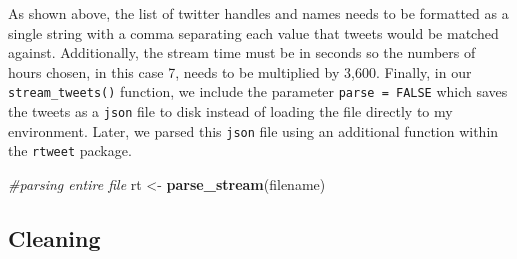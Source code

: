 \documentclass[12pt,twoside]{reedthesis}
\newenvironment{Shaded}{\begin{snugshade}}{\end{snugshade}}
\newcommand{\KeywordTok}[1]{\textcolor[rgb]{0.13,0.29,0.53}{\textbf{#1}}}
\newcommand{\StringTok}[1]{\textcolor[rgb]{0.31,0.60,0.02}{#1}}
\newcommand{\CommentTok}[1]{\textcolor[rgb]{0.56,0.35,0.01}{\textit{#1}}}
\newcommand{\NormalTok}[1]{#1}
\begin{document}
\normalsize

As shown above, the list of twitter handles and names needs to be
formatted as a single string with a comma separating each value that
tweets would be matched against. Additionally, the stream time must be
in seconds so the numbers of hours chosen, in this case 7, needs to be
multiplied by 3,600. Finally, in our \texttt{stream\_tweets()} function,
we include the parameter \texttt{parse\ =\ FALSE} which saves the tweets
as a \texttt{json} file to disk instead of loading the file directly to
my environment. Later, we parsed this \texttt{json} file using an
additional function within the \texttt{rtweet} package.

\small
\begin{Shaded}
\begin{Highlighting}[]
\CommentTok{#parsing entire file}
\NormalTok{rt <-}\StringTok{ }\KeywordTok{parse_stream}\NormalTok{(filename)}
\end{Highlighting}
\end{Shaded}
\normalsize

\subsection{Cleaning}\label{cleaning}
\end{document}

